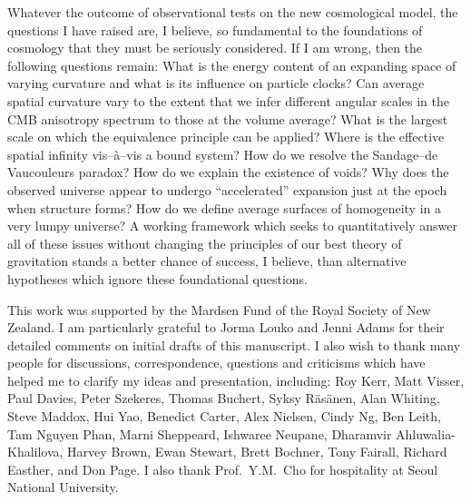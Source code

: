 \documentclass[12pt]{iopart}
\begin{document}
Whatever the outcome of observational tests on the new cosmological model, the
questions I have raised are, I believe, so fundamental to the foundations
of cosmology that they must be seriously considered. If I am wrong, then the
following questions remain: What is the energy content of an expanding space
of varying curvature and what is its influence on particle clocks? Can
average spatial curvature vary to the extent that we infer different
angular scales in the CMB anisotropy spectrum to those at the volume average?
What is the largest scale on which the equivalence principle can be applied?
Where is the effective spatial infinity vis--\`a--vis a bound system?
How do we resolve the Sandage--de Vaucouleurs paradox? How do we explain the
existence of voids? Why does the observed universe appear to undergo
``accelerated'' expansion just at the epoch when structure forms? How do we
define average surfaces of homogeneity in a very lumpy universe? A working
framework which seeks to
quantitatively answer all of these issues without changing the principles of
our best theory of gravitation stands a better chance of success, I believe,
than alternative hypotheses which ignore these foundational questions.

\ack

This work was supported by the Mardsen Fund of the Royal Society of New
Zealand. I am particularly grateful to Jorma Louko and Jenni Adams for their
detailed comments on initial drafts of this manuscript. I also wish to thank
many people for discussions, correspondence, questions and criticisms
which have helped me to clarify my ideas and presentation, including:
Roy Kerr, Matt Visser, Paul Davies, Peter Szekeres, Thomas Buchert,
Syksy R\"as\"anen, Alan Whiting, Steve Maddox, Hui Yao, Benedict Carter,
Alex Nielsen, Cindy Ng, Ben Leith, Tam Nguyen Phan, Marni Sheppeard,
Ishwaree Neupane, Dharamvir Ahluwalia-Khalilova, Harvey Brown, Ewan Stewart,
Brett Bochner, Tony Fairall, Richard Easther, and Don Page.
I also thank Prof.\ Y.M.~Cho for hospitality at Seoul National University.
\end{document}
